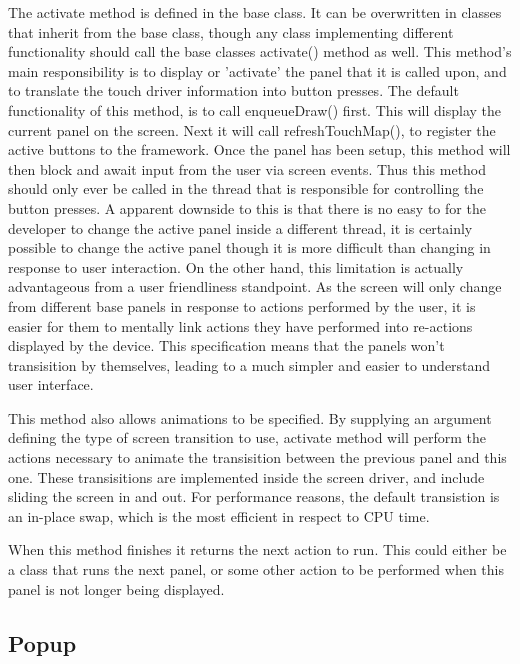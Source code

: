 The activate method is defined in the base class. It can be overwritten in classes that inherit from the base class, though any class implementing different functionality should call the base classes activate() method as well. This method's main responsibility is to display or 'activate' the panel that it is called upon, and to translate the touch driver information into button presses. The default functionality of this method, is to call enqueueDraw() first. This will display the current panel on the screen. Next it will call refreshTouchMap(), to register the active buttons to the framework. Once the panel has been setup, this method will then block and await input from the user via screen events. Thus this method should only ever be called in the thread that is responsible for controlling the button presses. A apparent downside to this is that there is no easy to for the developer to change the active panel inside a different thread, it is certainly possible to change the active panel though it is more difficult than changing in response to user interaction. On the other hand, this limitation is actually advantageous from a user friendliness standpoint. As the screen will only change from different base panels in response to actions performed by the user, it is easier for them to mentally link actions they have performed into re-actions displayed by the device. This specification means that the panels won't transisition by themselves, leading to a much simpler and easier to understand user interface. 

This method also allows animations to be specified. By supplying an argument defining the type of screen transition to use, activate method will perform the actions necessary to animate the transisition between the previous panel and this one. These transisitions are implemented inside the screen driver, and include sliding the screen in and out. For performance reasons, the default transistion is an in-place swap, which is the most efficient in respect to CPU time.

When this method finishes it returns the next action to run. This could either be a class that runs the next panel, or some other action to be performed when this panel is not longer being displayed.

\subsection{Popup}

